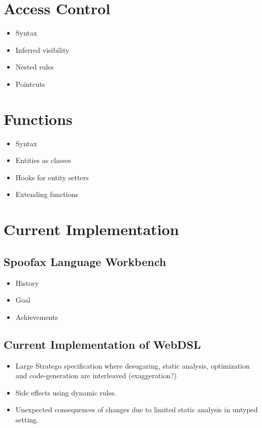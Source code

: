   \section{Access Control}

    \begin{itemize}
      \item Syntax
      \item Inferred visibility
      \item Nested rules
      \item Pointcuts
    \end{itemize}

  \section{Functions}

    \begin{itemize}
      \item Syntax
      \item Entities as classes
      \item Hooks for entity setters
      \item Extending functions
    \end{itemize}

  \section{Current Implementation}

    \subsection{Spoofax Language Workbench}

      \begin{itemize}
        \item History
        \item Goal
        \item Achievements
      \end{itemize}

    \subsection{Current Implementation of WebDSL}

      \begin{itemize}
        \item Large Stratego specification where desugaring, static analysis, optimization and code-generation are interleaved (exaggeration?)
        \item Side effects using dynamic rules.
        \item Unexpected consequences of changes due to limited static analysis in untyped setting.
      \end{itemize}

